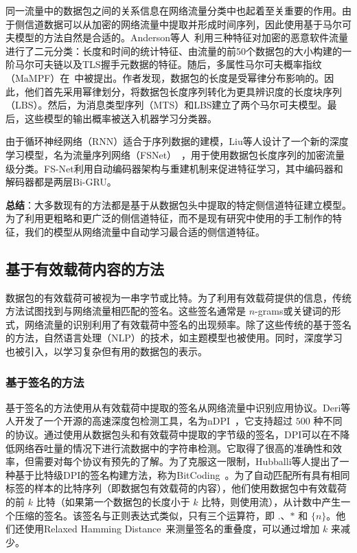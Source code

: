 \documentclass[degree=master,cjk-font=noto]{thuthesis}
\begin{document}
同一流量中的数据包之间的关系信息在网络流量分类中也起着至关重要的作用。由于侧信道数据可以从加密的网络流量中提取并形成时间序列，因此使用基于马尔可夫模型的方法自然是合适的。Anderson等人~\cite{kdd_encrypted_malware}利用三种特征对加密的恶意软件流量进行了二元分类：长度和时间的统计特征、由流量的前50个数据包的大小构建的一阶马尔可夫链以及TLS握手元数据的特征。随后，多属性马尔可夫概率指纹（MaMPF）在~\cite{MaMPF}中被提出。作者发现，数据包的长度是受幂律分布影响的。因此，他们首先采用幂律划分，将数据包长度序列转化为更具辨识度的长度块序列（LBS）。然后，为消息类型序列（MTS）和LBS建立了两个马尔可夫模型。最后，这些模型的输出概率被送入机器学习分类器。

由于循环神经网络（RNN）适合于序列数据的建模，Liu等人设计了一个新的深度学习模型，名为流量序列网络（FSNet）~\cite{fsnet}，用于使用数据包长度序列的加密流量级分类。FS-Net利用自动编码器架构与重建机制来促进特征学习，其中编码器和解码器都是两层Bi-GRU。

\textbf{总结}：大多数现有的方法都是基于从数据包头中提取的特定侧信道特征建立模型。为了利用更粗略和更广泛的侧信道特征，而不是现有研究中使用的手工制作的特征，我们的模型从网络流量中自动学习最合适的侧信道特征。

\subsection{基于有效载荷内容的方法}

数据包的有效载荷可被视为一串字节或比特。为了利用有效载荷提供的信息，传统方法试图找到与网络流量相匹配的签名。这些签名通常是 $n$-grams或关键词的形式，网络流量的识别利用了有效载荷中签名的出现频率。除了这些传统的基于签名的方法，自然语言处理（NLP）的技术，如主题模型也被使用。同时，深度学习也被引入，以学习复杂但有用的数据包的表示。

\subsubsection{基于签名的方法}

基于签名的方法使用从有效载荷中提取的签名从网络流量中识别应用协议。Deri等人开发了一个开源的高速深度包检测工具，名为nDPI~\cite{b24}，它支持超过 $500$ 种不同的协议。通过使用从数据包头和有效载荷中提取的字节级的签名，DPI可以在不降低网络吞吐量的情况下进行流数据中的字符串检测。它取得了很高的准确性和效率，但需要对每个协议有预先的了解。为了克服这一限制，Hubballi等人提出了一种基于比特级DPI的签名构建方法，称为BitCoding~\cite{bitcoding}。为了自动匹配所有具有相同标签的样本的比特序列（即数据包有效载荷的内容），他们使用数据包中有效载荷的前 $k$ 比特（如果第一个数据包的长度小于 $k$ 比特，则使用流），从计数中产生一个压缩的签名。该签名与正则表达式类似，只有三个运算符，即 $.$、$*$ 和 $\{n\}$。他们还使用Relaxed Hamming Distance~\cite{bitcoding}来测量签名的重叠度，可以通过增加 $k$ 来减少。
\end{document}
